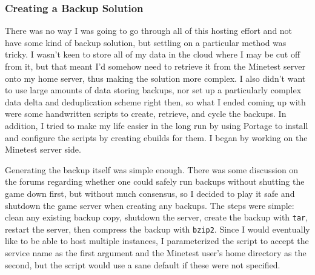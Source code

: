 \documentclass{article}
\begin{document}
\subsubsection{Creating a Backup Solution}
There was no way I was going to go through all of this hosting effort and not have some kind of backup solution, but settling on a particular method was tricky.  I wasn't keen to store all of my data in the cloud where I may be cut off from it, but that meant I'd somehow need to retrieve it from the Minetest server onto my home server, thus making the solution more complex.  I also didn't want to use large amounts of data storing backups, nor set up a particularly complex data delta and deduplication scheme right then, so what I ended coming up with were some handwritten scripts to create, retrieve, and cycle the backups.  In addition, I tried to make my life easier in the long run by using Portage to install and configure the scripts by creating ebuilds for them.  I began by working on the Minetest server side.

Generating the backup itself was simple enough.  There was some discussion on the forums regarding whether one could safely run backups without shutting the game down first, but without much consensus, so I decided to play it safe and shutdown the game server when creating any backups.  The steps were simple: clean any existing backup copy, shutdown the server, create the backup with \texttt{tar}, restart the server, then compress the backup with \texttt{bzip2}.  Since I would eventually like to be able to host multiple instances, I parameterized the script to accept the service name as the first argument and the Minetest user's home directory as the second, but the script would use a sane default if these were not specified.
\end{document}

